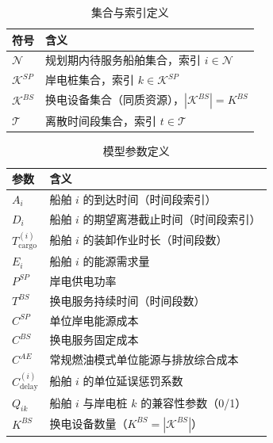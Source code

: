 \documentclass[UTF8, a4paper, 12pt]{ctexart}
\begin{document}
\begin{table}[p]
\centering
\caption{集合与索引定义}
\begin{tabular}{ll}
\toprule
符号 & 含义 \\
\midrule
$\mathcal{N}$ & 规划期内待服务船舶集合，索引 $i \in \mathcal{N}$ \\
$\mathcal{K}^{SP}$ & 岸电桩集合，索引 $k \in \mathcal{K}^{SP}$ \\
$\mathcal{K}^{BS}$ & 换电设备集合（同质资源），$|\mathcal{K}^{BS}| = K^{BS}$ \\
$\mathcal{T}$ & 离散时间段集合，索引 $t \in \mathcal{T}$ \\
\bottomrule
\end{tabular}
\end{table}


\begin{table}[htbp]
\centering
\caption{模型参数定义}
\begin{tabular}{ll}
\toprule
参数 & 含义 \\
\midrule
$A_i$ & 船舶 $i$ 的到达时间（时间段索引） \\
$D_i$ & 船舶 $i$ 的期望离港截止时间（时间段索引） \\
$T^{(i)}_{\text{cargo}}$ & 船舶 $i$ 的装卸作业时长（时间段数） \\
$E_i$ & 船舶 $i$ 的能源需求量 \\
$P^{SP}$ & 岸电供电功率 \\
$T^{BS}$ & 换电服务持续时间（时间段数） \\
$C^{SP}$ & 单位岸电能源成本 \\
$C^{BS}$ & 换电服务固定成本 \\
$C^{AE}$ & 常规燃油模式单位能源与排放综合成本 \\
$C^{(i)}_{\text{delay}}$ & 船舶 $i$ 的单位延误惩罚系数 \\
$Q_{ik}$ & 船舶 $i$ 与岸电桩 $k$ 的兼容性参数（0/1） \\
$K^{BS}$ & 换电设备数量（$K^{BS}=|\mathcal{K}^{BS}|$） \\
\bottomrule
\end{tabular}
\end{table}
\end{document}
